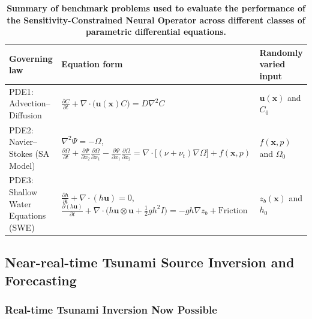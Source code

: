 \begin{table}[htbp]
    \centering
    \caption{\scriptsize\textbf{Summary of benchmark problems used to evaluate the performance of the Sensitivity-Constrained Neural Operator across different classes of parametric differential equations.}}
    \label{tab:pde-summary}
    \tiny
    \begin{tabular}{p{}p{}p{}}
        \hline
        Governing law & Equation form & Randomly varied input\\
        \hline
        PDE1: Advection--Diffusion &
        $\frac{\partial C}{\partial t} + \nabla \cdot \bigl( \mathbf{u}(\mathbf{x}) C \bigr) = D \nabla^2 C$ &
        $\mathbf{u}(\mathbf{x})$ and $C_0$\\[1em]
        
        PDE2: Navier--Stokes (SA Model) &
        $\nabla^2 \Psi = -\Omega$, 
        $\frac{\partial \Omega}{\partial t} 
        + \frac{\partial \Psi}{\partial x_2} \frac{\partial \Omega}{\partial x_1} 
        - \frac{\partial \Psi}{\partial x_1} \frac{\partial \Omega}{\partial x_2} 
        = \nabla \cdot \bigl[ (\nu + \nu_t) \nabla \Omega \bigr] + f(\mathbf{x}, p)$ &
        $f(\mathbf{x}, p)$ and $\Omega_0$ \\[1em]
        
        PDE3: Shallow Water Equations (SWE) &
        $\frac{\partial h}{\partial t} + \nabla \cdot (h \mathbf{u}) = 0$,
        $\frac{\partial (h \mathbf{u})}{\partial t} 
        + \nabla \cdot \bigl( h \mathbf{u} \otimes \mathbf{u} + \frac{1}{2} g h^2 I \bigr) 
        = -gh \nabla z_b + \text{Friction}$ &
        $z_b(\mathbf{x})$ and $h_0$\\
        \hline
    \end{tabular}
\end{table}


\subsection{Near-real-time Tsunami Source Inversion and Forecasting}
\label{sec:SWE-Tohoku}
\subsubsection{Real-time Tsunami Inversion Now Possible}





